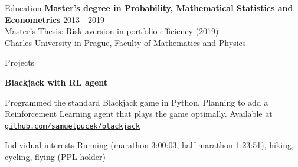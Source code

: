\documentclass[
	11pt, %
]{resume} %
\begin{document}
\newpage
\begin{rSection}{Education}
    {\bf Master's degree in Probability, Mathematical Statistics and Econometrics} \hfill {2013 - 2019} 
    \\ Master's Thesis: Risk aversion in portfolio efficiency (2019)
    \\ Charles University in Prague, Faculty of Mathematics and Physics
    \end{rSection}


\begin{rSection}{Projects}
	
	{\bf Blackjack with RL agent}

	Programmed the standard Blackjack game in Python. Planning to add a Reinforcement Learning agent that plays the game optimally. Available at \href{https://github.com/samuelpucek/blackjack}{\texttt{github.com/samuelpucek/blackjack}} %

\end{rSection}

\begin{rSection}{Individual interests}
	Running (marathon 3:00:03, half-marathon 1:23:51), hiking, cycling, flying (PPL holder)
	\end{rSection}
	
	
\end{document}
